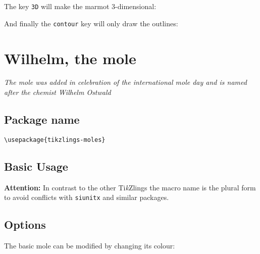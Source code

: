 \documentclass[parskip=half]{scrartcl}
\newcommand{\tikzlings}{Ti\emph{k}Zlings\xspace}
\begin{document}
The key \lstinline|3D| will make the marmot 3-dimensional:
\begin{tcblisting}{}
\marmot[3D]
\end{tcblisting}

And finally the \lstinline|contour| key will only draw the outlines:
\begin{tcblisting}{}
\marmot[contour=black]
\end{tcblisting}

%
%
\clearpage
\section[Mole]{Wilhelm, the mole}

\emph{The mole was added in celebration of the international mole day and is named after the chemist Wilhelm Ostwald}

\subsection{Package name}

\begin{tcolorbox}[lower separated=false, lefthand width=.8\linewidth]
\vspace*{0.5cm}
\lstinline|\usepackage{tikzlings-moles}| 
\vspace*{0.5cm}
\end{tcolorbox}

\subsection{Basic Usage}

\textcolor{red!60!black}{\textbf{Attention:} In contrast to the other \tikzlings the macro name is the plural form to avoid conflicts with  \lstinline|siunitx| and similar packages.}
\begin{tcblisting}{}
\moles
\end{tcblisting}

\subsection{Options}

The basic mole can be modified by changing its colour:
\begin{tcblisting}{}
\moles[body=blue]
\end{tcblisting}
\end{document}
